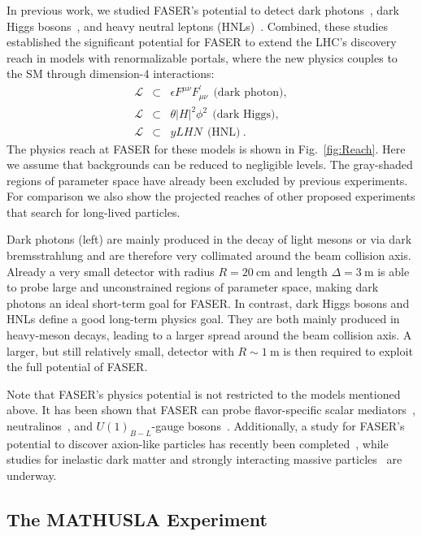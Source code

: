 In previous work, we studied FASER's potential to detect dark photons~\cite{Feng:2017uoz}, dark Higgs bosons~\cite{Feng:2017vli}, and heavy neutral leptons (HNLs)~\cite{Kling:2018wct}. Combined, these studies established the significant potential for FASER to extend the LHC's discovery reach in models with renormalizable portals, where the new physics couples to the SM through dimension-4 interactions:
\begin{eqnarray}
\mathcal{L} &\subset& \epsilon F^{\mu\nu} F_{\mu\nu}^{'} \ \ \text{(dark photon)},\\
\mathcal{L} &\subset& \theta |H|^2 \phi^2  \ \ \text{(dark Higgs)},\\
\mathcal{L} &\subset& y L H N  \ \ \text{(HNL)}  \ .
\end{eqnarray}
The physics reach at FASER for these models is shown in Fig.~\ref{fig:Reach}. Here we assume that backgrounds can be reduced to negligible levels. The gray-shaded regions of parameter space have already been excluded by previous experiments. For comparison we also show the projected reaches of other proposed experiments that search for long-lived particles. 

Dark photons (left) are mainly produced in the decay of light mesons or via dark bremsstrahlung and are therefore very collimated around the beam collision axis. Already a very small detector with radius $R=20~\text{cm}$ and length $\Delta=3~\text{m}$ is able to probe large and unconstrained regions of parameter space, making dark photons an ideal short-term goal for FASER. In contrast, dark Higgs bosons and HNLs define a good long-term physics goal. They are both mainly produced in heavy-meson decays, leading to a larger spread around the beam collision axis. A larger, but still relatively small, detector with $R\sim 1~\text{m}$ is then required to exploit the full potential of FASER. 

Note that FASER's physics potential is not restricted to the models mentioned above. It has been shown that FASER can probe flavor-specific scalar mediators~\cite{Batell:2017kty}, neutralinos~\cite{Helo:2018qej}, and $U(1)_{B-L}$-gauge bosons~\cite{Bauer:2018onh}. Additionally, a study for FASER's potential to discover axion-like particles has recently been completed~\cite{Feng:2018pew}, while studies for inelastic dark matter and strongly interacting massive particles~\cite{Berlin:inprep} are underway. 


\subsection{The MATHUSLA Experiment}
\label{sec:MATHUSLA}

